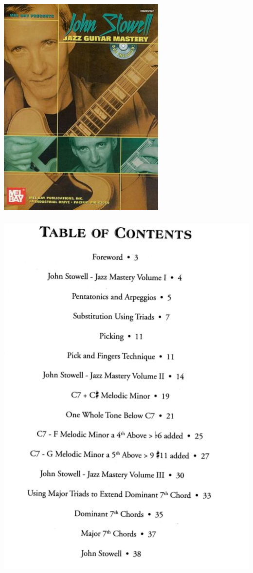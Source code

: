 \documentclass[a4paper]{book}
\begin{document}
\begin{center}
\includegraphics[width=8.398cm,height=11.188cm]{lebluessupportsmethodes-img111.jpg}
\end{center}



\clearpage

\begin{center}
\includegraphics[width=13.704cm,height=19.232cm]{lebluessupportsmethodes-img112.png}
\end{center}
\end{document}
